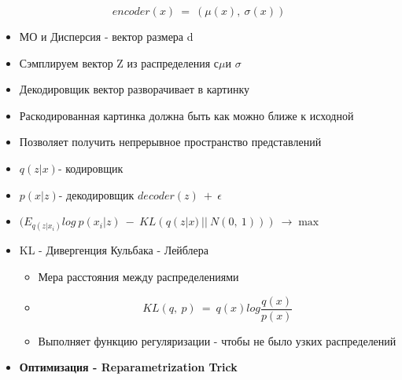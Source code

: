 \documentclass[a4paper, 12pt]{article}
\begin{document}
\[encoder(x)\  = \ (\mu(x),\ \sigma(x))\]


\begin{itemize}
\item
  
  МО и Дисперсия - вектор размера d
  
\item
  
  Сэмплируем вектор Z из распределения с\(\mu\)и \(\sigma\)
  
\item
  
  Декодировщик вектор разворачивает в картинку
  
\item
  
  Раскодированная картинка должна быть как можно ближе к исходной
  
\item
  
  Позволяет получить непрерывное пространство представлений
  
\item
  
  \(q(z|x)\)- кодировщик
  
\item
  
  \(p(x|z)\)- декодировщик \(decoder(z)\  + \ \epsilon\)
  
\item
  
  \((E_{q(z|x_{i})}log\ p(x_{i}|z)\  - \ KL(q(z|x)\ ||\ N(0,\ 1)))\  \rightarrow \max\)
  
\item
  
  KL - Дивергенция Кульбака - Лейблера
  

  \begin{itemize}
  \item
    
    Мера расстояния между распределениями
    
  \item
    
    \[KL(q,\ p)\  = \ q(x)log\frac{q(x)}{p(x)}\]
    
  \item
    
    Выполняет функцию регуляризации - чтобы не было узких распределений
    
  \end{itemize}
\item
  
  \textbf{Оптимизация - Reparametrization Trick}
  


\end{itemize}
\end{document}
